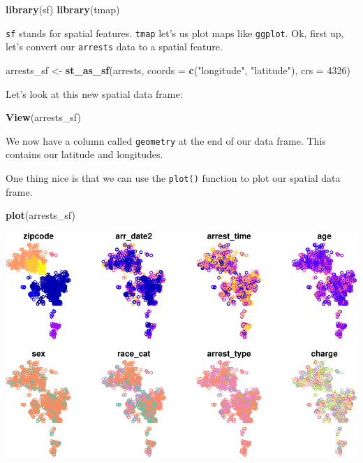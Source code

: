 \documentclass[]{book}
\newenvironment{Shaded}{\begin{snugshade}}{\end{snugshade}}
\newcommand{\DataTypeTok}[1]{\textcolor[rgb]{0.13,0.29,0.53}{#1}}
\newcommand{\DecValTok}[1]{\textcolor[rgb]{0.00,0.00,0.81}{#1}}
\newcommand{\KeywordTok}[1]{\textcolor[rgb]{0.13,0.29,0.53}{\textbf{#1}}}
\newcommand{\NormalTok}[1]{#1}
\newcommand{\StringTok}[1]{\textcolor[rgb]{0.31,0.60,0.02}{#1}}
\begin{document}
\begin{Shaded}
\begin{Highlighting}[]
\KeywordTok{library}\NormalTok{(sf)}
\KeywordTok{library}\NormalTok{(tmap)}
\end{Highlighting}
\end{Shaded}

\texttt{sf} stands for spatial features. \texttt{tmap} let's us plot maps like \texttt{ggplot}. Ok, first up, let's convert our \texttt{arrests} data to a spatial feature.

\begin{Shaded}
\begin{Highlighting}[]
\NormalTok{arrests_sf <-}\StringTok{ }\KeywordTok{st_as_sf}\NormalTok{(arrests, }\DataTypeTok{coords =} \KeywordTok{c}\NormalTok{(}\StringTok{"longitude"}\NormalTok{, }\StringTok{"latitude"}\NormalTok{), }\DataTypeTok{crs =} \DecValTok{4326}\NormalTok{)}
\end{Highlighting}
\end{Shaded}

Let's look at this new spatial data frame:

\begin{Shaded}
\begin{Highlighting}[]
\KeywordTok{View}\NormalTok{(arrests_sf)}
\end{Highlighting}
\end{Shaded}

We now have a column called \texttt{geometry} at the end of our data frame. This contains our latitude and longitudes.

One thing nice is that we can use the \texttt{plot()} function to plot our spatial data frame.

\begin{Shaded}
\begin{Highlighting}[]
\KeywordTok{plot}\NormalTok{(arrests_sf)}
\end{Highlighting}
\end{Shaded}

\begin{center}\includegraphics[width=\textwidth]{afam-188r_files/figure-latex/unnamed-chunk-16-1} \end{center}
\end{document}
